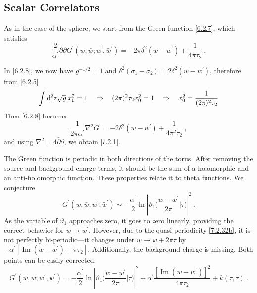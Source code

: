 \subsection*{Scalar Correlators} 
As in the case of the sphere, we start from the Green function \eqref{6.2.7}, which satisfies 
\begin{equation}
	\frac{2}{\alpha^{\prime}} \bar{\partial} \partial G^{\prime}(w, \bar{w} ; w^{\prime}, \bar{w}^{\prime})
	=-2 \pi \delta^{2}(w-w^{\prime})+\frac{1}{4 \pi \tau_{2}} \:. \label{7.2.1} 
\end{equation}
\begin{tcolorbox}[breakable]
	\begin{remark}
		In \eqref{6.2.8}, we now have $g^{-1/2}=1$ and $ \delta^{2}(\sigma_{1}-\sigma_{2})=2 \delta^{2}(w-w^{\prime})$, therefore from \eqref{6.2.5}
		\[
		\int \mathrm{d}^{2} z\sqrt{g}\: x_{0}^{2}=1 \quad \Rightarrow \quad (2 \pi)^{2} \tau_{2} x_{0}^{2}=1 \quad \Rightarrow \quad 
		x_{0}^{2}=\frac{1}{(2 \pi)^{2} \tau_{2}}
		\]
		Then \eqref{6.2.8} becomes
		\[
		\frac{1}{2 \pi \alpha^{\prime}} \nabla^{2} G^{\prime} =-2 \delta^{2}(w-w^{\prime})+\frac{1}{4 \pi^{2} \tau_{2}} \:,
		\]
		and using $\nabla^{2}=4\bar{\partial} \partial$, we obtain \eqref{7.2.1}.
	\end{remark}
\end{tcolorbox}
\noindent The Green function is periodic in both directions of the torus. After removing the source and background charge terms, it should be the sum of a holomorphic and an anti-holomorphic function. These properties relate it to theta functions. 
We conjecture 
\begin{equation}
	G^{\prime}(w, \bar{w} ; w^{\prime}, \bar{w}^{\prime}) \sim-\frac{\alpha^{\prime}}{2}
	\ln \left|\vartheta_{1}\biggl(\frac{w-w^{\prime}}{2 \pi} \Big\vert \tau\biggr)\right|^{2} \:. \label{7.2.2} 
\end{equation}
As the variable of $\vartheta_{1}$ approaches zero, it goes to zero linearly, providing the correct behavior for $w \rightarrow w^{\prime} $. 
However, due to the quasi-periodicity \eqref{7.2.32b}, it is not perfectly bi-periodic—it changes under $w \rightarrow w+2 \pi \tau$ by $-\alpha^{\prime}[\operatorname{Im}(w-w^{\prime})+\pi \tau_{2}]$. 
Additionally, the background charge is missing. Both points can be easily corrected: 
\begin{equation}
	G^{\prime}(w, \bar{w} ; w^{\prime}, \bar{w}^{\prime} ) = -\frac{\alpha^{\prime}}{2} 
	\ln \left|\vartheta_{1}\biggl(\frac{w-w^{\prime}}{2 \pi} \Big\vert \tau\biggr)\right|^{2}+
	\alpha^{\prime} \frac{[\operatorname{Im}(w-w^{\prime})]^{2}}{4 \pi \tau_{2}}+k(\tau, \bar{\tau}) \:. \label{7.2.3} 
\end{equation}
